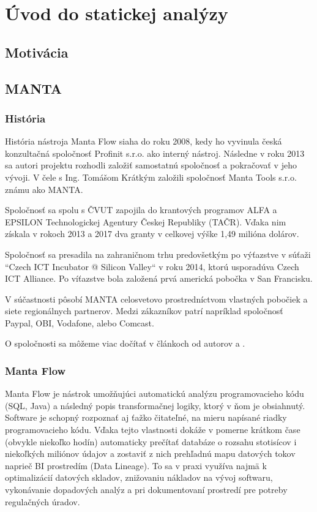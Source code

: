 
\chapter{Úvod do statickej analýzy}

\section{Motivácia}

\section{MANTA}

\subsection{História}

História nástroja Manta Flow siaha do roku 2008, kedy ho vyvinula česká konzultačná spoločnosť Profinit s.r.o. ako interný nástroj.
Následne v roku 2013 sa autori projektu rozhodli založiť samostatnú spoločnosť a pokračovať v jeho vývoji.
V čele s Ing. Tomášom Krátkým založili spoločnosť Manta Tools s.r.o. známu ako MANTA.

Spoločnosť sa spolu s ČVUT zapojila do krantových programov ALFA a EPSILON Technologickej Agentury Českej Republiky (TAČR).
Vďaka nim získala v rokoch 2013 a 2017 dva granty v celkovej výške 1,49 milióna dolárov.

Spoločnosť sa presadila na zahraničnom trhu predovšetkým po výťazstve v súťaži ``Czech ICT Incubator @ Silicon Valley`` v roku 2014,
ktorú usporadúva Czech ICT Alliance. Po víťazstve bola založená prvá americká pobočka v San Francisku.

V súčastnosti pôsobí MANTA celosvetovo prostredníctvom vlastných pobočiek a siete regionálnych partnerov.
Medzi zákazníkov patrí napríklad spoločnosť Paypal, OBI, Vodafone, alebo Comcast.

O spoločnosti sa môžeme viac dočítať v článkoch od autorov \citet{MANTA} a \citet{MANTA_HISTORIA}.

\subsection{Manta Flow}

Manta Flow je nástrok umožňujúci automatickú analýzu programovacieho kódu (SQL, Java) a následný popis transformačnej logiky,
ktorý v ňom je obsiahnutý. Software je schopný rozpoznať aj ťažko čitateľné, na mieru napísané riadky programovacieho kódu.
Vďaka tejto vlastnosti dokáže v pomerne krátkom čase (obvykle niekoľko hodín) automaticky prečítať databáze o rozsahu
stotisícov i niekoľkých miliónov údajov a zostaviť z nich prehľadnú mapu datových tokov naprieč BI prostredím (Data Lineage).
To sa v praxi využíva najmä k optimalizácií datových skladov, znižovaniu nákladov na vývoj softwaru, vykonávanie dopadových
analýz a pri dokumentovaní prostredí pre potreby regulačných úradov.


